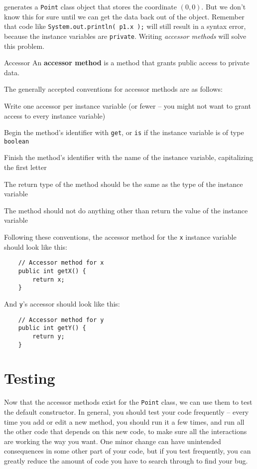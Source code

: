 generates a \texttt{Point} class object that stores the coordinate $(0,0)$.  But we don't know this for sure until we can get the data back out of the object.  Remember that code like \texttt{System.out.println( p1.x );} will still result in a syntax error, because the instance variables are \texttt{private}.  Writing \textit{accessor methods} will solve this problem.

\begin{defn}{Accessor}
    An \textbf{accessor method} is a method that grants public access to private data.
\end{defn}

The generally accepted conventions for accessor methods are as follows:
\bi
\item Write one accessor per instance variable (or fewer -- you might not want to grant access to every instance variable)
\item Begin the method's identifier with \texttt{get}, or \texttt{is} if the instance variable is of type \texttt{boolean}
\item Finish the method's identifier with the name of the instance variable, capitalizing the first letter
\item The return type of the method should be the same as the type of the instance variable
\item The method should not do anything other than return the value of the instance variable
\ei

Following these conventions, the accessor method for the \texttt{x} instance variable should look like this:

\begin{verbatim}
    // Accessor method for x
    public int getX() {
        return x;
    }
\end{verbatim}

And \texttt{y}'s accessor should look like this:

\begin{verbatim}
    // Accessor method for y
    public int getY() {
        return y;
    }
\end{verbatim}

\section{Testing}

Now that the accessor methods exist for the \texttt{Point} class, we can use them to test the default constructor.  In general, you should test your code frequently -- every time you add or edit a new method, you should run it a few times, and run all the other code that depends on this new code, to make sure all the interactions are working the way you want.  One minor change can have unintended consequences in some other part of your code, but if you test frequently, you can greatly reduce the amount of code you have to search through to find your bug.

